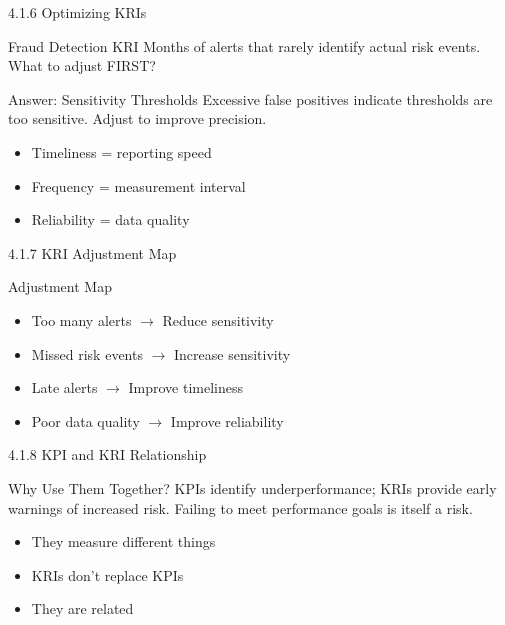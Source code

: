 \documentclass{beamer}
\begin{document}
	\begin{frame}{4.1.6 Optimizing KRIs}
		\begin{block}{Fraud Detection KRI}
			Months of alerts that rarely identify actual risk events. What to adjust FIRST?
		\end{block}
		\begin{exampleblock}{Answer: Sensitivity Thresholds}
			Excessive false positives indicate thresholds are too sensitive. Adjust to improve precision.
		\end{exampleblock}
		\begin{itemize}
			\item Timeliness = reporting speed
			\item Frequency = measurement interval
			\item Reliability = data quality
		\end{itemize}
	\end{frame}
	
	\begin{frame}{4.1.7 KRI Adjustment Map}
		\begin{block}{Adjustment Map}
			\begin{itemize}
				\item Too many alerts $\rightarrow$ Reduce sensitivity
				\item Missed risk events $\rightarrow$ Increase sensitivity
				\item Late alerts $\rightarrow$ Improve timeliness
				\item Poor data quality $\rightarrow$ Improve reliability
			\end{itemize}
		\end{block}
	\end{frame}
	
	\begin{frame}{4.1.8 KPI and KRI Relationship}
		\begin{block}{Why Use Them Together?}
			KPIs identify underperformance; KRIs provide early warnings of increased risk. Failing to meet performance goals is itself a risk.
		\end{block}
		\begin{itemize}
			\item They measure different things
			\item KRIs don't replace KPIs
			\item They are related
		\end{itemize}
	\end{frame}
	
\end{document}
